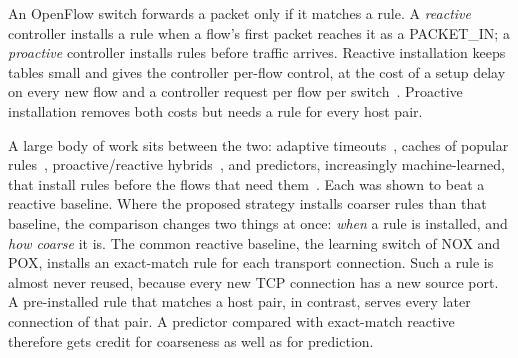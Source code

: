 \documentclass[sigconf]{acmart}
\begin{document}
An OpenFlow switch forwards a packet only if it matches a rule. A \emph{reactive} controller installs a rule when a flow's first packet reaches it as a PACKET\_IN; a \emph{proactive} controller installs rules before traffic arrives. Reactive installation keeps tables small and gives the controller per-flow control, at the cost of a setup delay on every new flow and a controller request per flow per switch~\cite{ethane,difane,devoflow}. Proactive installation removes both costs but needs a rule for every host pair.

A large body of work sits between the two: adaptive timeouts~\cite{smarttime,ahihta}, caches of popular rules~\cite{cacheflow}, proactive/reactive hybrids~\cite{pard,kim2022}, and predictors, increasingly machine-learned, that install rules before the flows that need them~\cite{batista2024,rouf2025}. Each was shown to beat a reactive baseline. Where the proposed strategy installs coarser rules than that baseline, the comparison changes two things at once: \emph{when} a rule is installed, and \emph{how coarse} it is. The common reactive baseline, the learning switch of NOX and POX, installs an exact-match rule for each transport connection. Such a rule is almost never reused, because every new TCP connection has a new source port. A pre-installed rule that matches a host pair, in contrast, serves every later connection of that pair. A predictor compared with exact-match reactive therefore gets credit for coarseness as well as for prediction.
\end{document}
